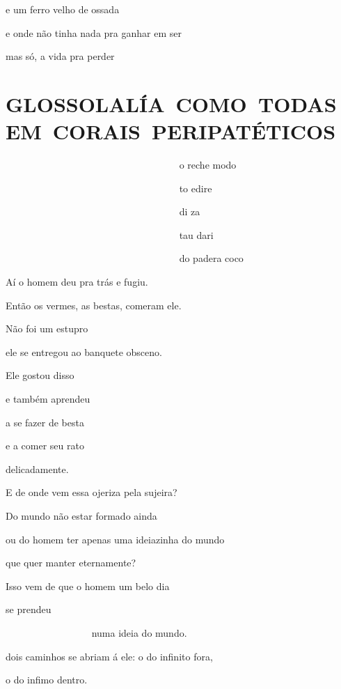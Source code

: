 e um ferro velho de ossada

e onde não tinha nada pra ganhar em ser \EP[1]

mas só, a vida pra perder


\section*{\mbox{GLOSSOLALÍA COMO TODAS EM CORAIS PERIPATÉTICOS}}

~~~~~~~~~~~~~~~~~~~~~~~~~~~~~~~~~~~ o reche modo

~~~~~~~~~~~~~~~~~~~~~~~~~~~~~~~~~~~ to edire

~~~~~~~~~~~~~~~~~~~~~~~~~~~~~~~~~~~ di za

~~~~~~~~~~~~~~~~~~~~~~~~~~~~~~~~~~~ tau dari

~~~~~~~~~~~~~~~~~~~~~~~~~~~~~~~~~~~ do padera coco


Aí o homem deu pra trás e fugiu.


Então os vermes, as bestas, comeram ele.


Não foi um estupro

ele se entregou ao banquete obsceno.


Ele gostou disso

e também aprendeu

a se fazer de besta

e a comer seu rato

delicadamente.


E de onde vem essa ojeriza pela sujeira?

Do mundo não estar formado ainda

ou do homem ter apenas uma ideiazinha do mundo

que quer manter eternamente?

Isso vem de que o homem um belo dia


se prendeu

~~~~~~~~~~~~~~~~~ numa ideia do mundo.

dois caminhos se abriam á ele: o do infinito fora, 

o do infimo dentro.

